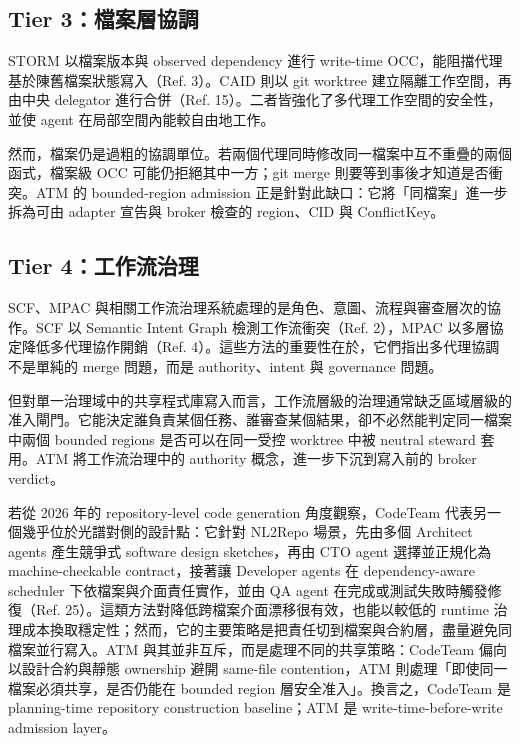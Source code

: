 \documentclass[a4paper,fontset=none]{ctexart}
\begin{document}
\subsection{Tier 3：檔案層協調}

STORM 以檔案版本與 observed dependency 進行 write-time OCC，能阻擋代理基於陳舊檔案狀態寫入（Ref. 3）。CAID 則以 git worktree 建立隔離工作空間，再由中央 delegator 進行合併（Ref. 15）。二者皆強化了多代理工作空間的安全性，並使 agent 在局部空間內能較自由地工作。

然而，檔案仍是過粗的協調單位。若兩個代理同時修改同一檔案中互不重疊的兩個函式，檔案級 OCC 可能仍拒絕其中一方；git merge 則要等到事後才知道是否衝突。ATM 的 bounded-region admission 正是針對此缺口：它將「同檔案」進一步拆為可由 adapter 宣告與 broker 檢查的 region、CID 與 ConflictKey。

\subsection{Tier 4：工作流治理}

SCF、MPAC 與相關工作流治理系統處理的是角色、意圖、流程與審查層次的協作。SCF 以 Semantic Intent Graph 檢測工作流衝突（Ref. 2），MPAC 以多層協定降低多代理協作開銷（Ref. 4）。這些方法的重要性在於，它們指出多代理協調不是單純的 merge 問題，而是 authority、intent 與 governance 問題。

但對單一治理域中的共享程式庫寫入而言，工作流層級的治理通常缺乏區域層級的准入閘門。它能決定誰負責某個任務、誰審查某個結果，卻不必然能判定同一檔案中兩個 bounded regions 是否可以在同一受控 worktree 中被 neutral steward 套用。ATM 將工作流治理中的 authority 概念，進一步下沉到寫入前的 broker verdict。

若從 2026 年的 repository-level code generation 角度觀察，CodeTeam 代表另一個幾乎位於光譜對側的設計點：它針對 NL2Repo 場景，先由多個 Architect agents 產生競爭式 software design sketches，再由 CTO agent 選擇並正規化為 machine-checkable contract，接著讓 Developer agents 在 dependency-aware scheduler 下依檔案與介面責任實作，並由 QA agent 在完成或測試失敗時觸發修復（Ref. 25）。這類方法對降低跨檔案介面漂移很有效，也能以較低的 runtime 治理成本換取穩定性；然而，它的主要策略是把責任切到檔案與合約層，盡量避免同檔案並行寫入。ATM 與其並非互斥，而是處理不同的共享策略：CodeTeam 偏向以設計合約與靜態 ownership 避開 same-file contention，ATM 則處理「即使同一檔案必須共享，是否仍能在 bounded region 層安全准入」。換言之，CodeTeam 是 planning-time repository construction baseline；ATM 是 write-time-before-write admission layer。
\end{document}
